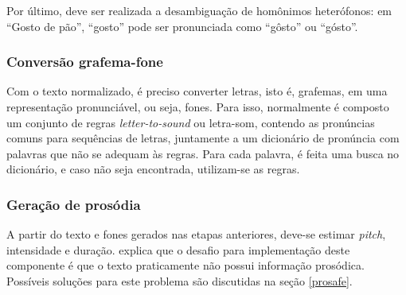 Por último, deve ser realizada a desambiguação de homônimos heterófonos: em
``Gosto de pão'', ``gosto'' pode ser pronunciada como ``gôsto'' ou ``gósto''.

\subsubsection{Conversão grafema-fone}
Com o texto normalizado, é preciso converter letras, isto é, grafemas, em uma
representação pronunciável, ou seja, fones. Para isso, normalmente é composto um
conjunto de regras \emph{letter-to-sound} ou letra-som, contendo as pronúncias
comuns para sequências de letras, juntamente a um dicionário de pronúncia com
palavras que não se adequam às regras. Para cada palavra, é feita uma busca no
dicionário, e caso não seja encontrada, utilizam-se as regras.

\subsubsection{Geração de prosódia}
\label{gerpros}
A partir do texto e fones gerados nas etapas anteriores, deve-se estimar
\emph{pitch}, intensidade e duração.  explica que o
desafio para implementação deste componente é que o texto praticamente não
possui informação prosódica. Possíveis soluções para este problema são
discutidas na seção \ref{prosafe}.

